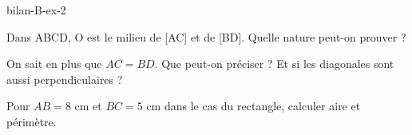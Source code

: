 \begin{blocEdition}{bilan-B-ex-2}
\begin{questions}
\item Dans ABCD, O est le milieu de [AC] et de [BD]. Quelle nature peut-on prouver ?
\item On sait en plus que $AC=BD$. Que peut-on préciser ? Et si les diagonales sont aussi perpendiculaires ?
\item Pour $AB=8$ cm et $BC=5$ cm dans le cas du rectangle, calculer aire et périmètre.
\end{questions}\label{fig-bilan-B-ex-2}
\par{}\par\par{}\par{}\par{}\par{}\par{}\par{}
\end{blocEdition}
